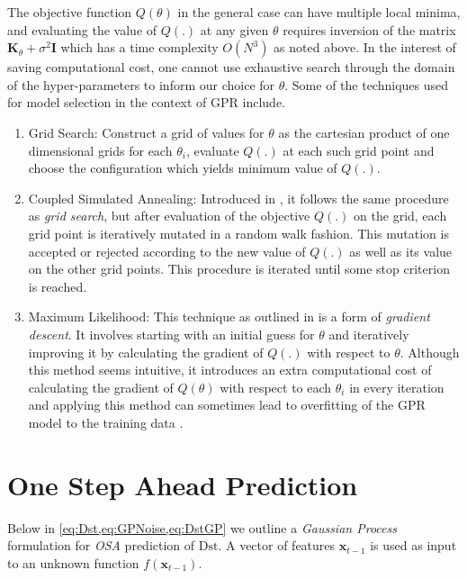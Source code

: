 The objective function $Q(\theta)$ in the general case can have multiple local minima, and 
evaluating the value of $Q(.)$ at any given $\theta$ requires inversion of the matrix 
$\mathbf{K}_\theta + \sigma^{2} \mathbf{I}$ which has a time complexity $O(N^3)$ as noted above. 
In the interest of saving computational cost, one cannot use exhaustive search through the domain 
of the hyper-parameters to inform our choice for $\theta$. Some of the techniques used for model 
selection in the context of GPR include.

\begin{enumerate}
\item Grid Search: Construct a grid of values for $\theta$ as the cartesian product of one 
      dimensional grids for each $\theta_i$, evaluate $Q(.)$ at each such grid point and choose the 
      configuration which yields minimum value of $Q(.)$.

\item Coupled Simulated Annealing: Introduced in \citet{Xavier-De-Souza2010}, it follows the same 
      procedure as \emph{grid search}, but after evaluation of the objective $Q(.)$ on the grid, 
      each grid point is iteratively mutated in a random walk fashion. This mutation is accepted or 
      rejected according to the new value of $Q(.)$ as well as its value on the other grid points. 
      This procedure is iterated until some stop criterion is reached.

\item Maximum Likelihood: This technique as outlined in \citet{Rasmussen:2005:GPM:1162254} is a 
      form of \emph{gradient descent}. It involves starting with an initial guess for $\theta$ and 
      iteratively improving it by calculating the gradient of $Q(.)$ with respect to $\theta$. 
      Although this method seems intuitive, it introduces an extra computational cost of 
      calculating the gradient of $Q(\theta)$ with respect to each $\theta_i$ in every iteration 
      and applying this method can sometimes lead to overfitting of the GPR model to the training 
      data \citet{Rasmussen:2005:GPM:1162254}.
\end{enumerate}

\section{One Step Ahead Prediction} \label{sec:osa}

Below in \cref{eq:Dst,eq:GPNoise,eq:DstGP} we outline a \emph{Gaussian Process} formulation for \emph{OSA} prediction of $ \mathrm{Dst}$. A vector of features $\mathbf{x}_{t-1}$ is used as input to an unknown function $f(\mathbf{x}_{t-1})$.

